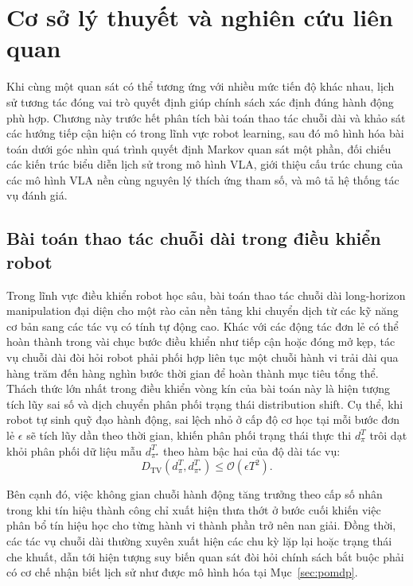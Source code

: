\chapter{Cơ sở lý thuyết và nghiên cứu liên quan}

Khi cùng một quan sát có thể tương ứng với nhiều mức tiến độ khác nhau, lịch sử tương tác đóng vai trò quyết định giúp chính sách xác định đúng hành động phù hợp. Chương này trước hết phân tích bài toán thao tác chuỗi dài và khảo sát các hướng tiếp cận hiện có trong lĩnh vực robot learning, sau đó mô hình hóa bài toán dưới góc nhìn quá trình quyết định Markov quan sát một phần, đối chiếu các kiến trúc biểu diễn lịch sử trong mô hình VLA, giới thiệu cấu trúc chung của các mô hình VLA nền cùng nguyên lý thích ứng tham số, và mô tả hệ thống tác vụ đánh giá.

\section{Bài toán thao tác chuỗi dài trong điều khiển robot}

Trong lĩnh vực điều khiển robot học sâu, bài toán thao tác chuỗi dài long-horizon manipulation đại diện cho một rào cản nền tảng khi chuyển dịch từ các kỹ năng cơ bản sang các tác vụ có tính tự động cao. Khác với các động tác đơn lẻ có thể hoàn thành trong vài chục bước điều khiển như tiếp cận hoặc đóng mở kẹp, tác vụ chuỗi dài đòi hỏi robot phải phối hợp liên tục một chuỗi hành vi trải dài qua hàng trăm đến hàng nghìn bước thời gian để hoàn thành mục tiêu tổng thể. Thách thức lớn nhất trong điều khiển vòng kín của bài toán này là hiện tượng tích lũy sai số và dịch chuyển phân phối trạng thái distribution shift. Cụ thể, khi robot tự sinh quỹ đạo hành động, sai lệch nhỏ ở cấp độ cơ học tại mỗi bước đơn lẻ $\epsilon$ sẽ tích lũy dần theo thời gian, khiến phân phối trạng thái thực thi $d_\pi^T$ trôi dạt khỏi phân phối dữ liệu mẫu $d_{\pi^\star}^T$ theo hàm bậc hai của độ dài tác vụ:
\begin{equation}
D_{\mathrm{TV}}\left(d_\pi^T, d_{\pi^\star}^T\right) \le \mathcal{O}(\epsilon T^2).
\label{eq:compounding-error}
\end{equation}

Bên cạnh đó, việc không gian chuỗi hành động tăng trưởng theo cấp số nhân trong khi tín hiệu thành công chỉ xuất hiện thưa thớt ở bước cuối khiến việc phân bổ tín hiệu học cho từng hành vi thành phần trở nên nan giải. Đồng thời, các tác vụ chuỗi dài thường xuyên xuất hiện các chu kỳ lặp lại hoặc trạng thái che khuất, dẫn tới hiện tượng suy biến quan sát đòi hỏi chính sách bắt buộc phải có cơ chế nhận biết lịch sử như được mô hình hóa tại Mục~\ref{sec:pomdp}.

